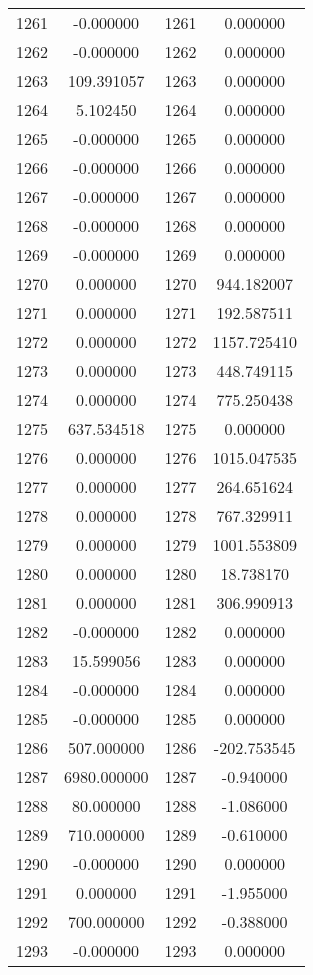 \documentclass[12pt]{article}
\begin{document}
\begin{longtable}{@{}cccc@{}}
1261 & -0.000000 & 1261 & 0.000000 \\
1262 & -0.000000 & 1262 & 0.000000 \\
1263 & 109.391057 & 1263 & 0.000000 \\
1264 & 5.102450 & 1264 & 0.000000 \\
1265 & -0.000000 & 1265 & 0.000000 \\
1266 & -0.000000 & 1266 & 0.000000 \\
1267 & -0.000000 & 1267 & 0.000000 \\
1268 & -0.000000 & 1268 & 0.000000 \\
1269 & -0.000000 & 1269 & 0.000000 \\
1270 & 0.000000 & 1270 & 944.182007 \\
1271 & 0.000000 & 1271 & 192.587511 \\
1272 & 0.000000 & 1272 & 1157.725410 \\
1273 & 0.000000 & 1273 & 448.749115 \\
1274 & 0.000000 & 1274 & 775.250438 \\
1275 & 637.534518 & 1275 & 0.000000 \\
1276 & 0.000000 & 1276 & 1015.047535 \\
1277 & 0.000000 & 1277 & 264.651624 \\
1278 & 0.000000 & 1278 & 767.329911 \\
1279 & 0.000000 & 1279 & 1001.553809 \\
1280 & 0.000000 & 1280 & 18.738170 \\
1281 & 0.000000 & 1281 & 306.990913 \\
1282 & -0.000000 & 1282 & 0.000000 \\
1283 & 15.599056 & 1283 & 0.000000 \\
1284 & -0.000000 & 1284 & 0.000000 \\
1285 & -0.000000 & 1285 & 0.000000 \\
1286 & 507.000000 & 1286 & -202.753545 \\
1287 & 6980.000000 & 1287 & -0.940000 \\
1288 & 80.000000 & 1288 & -1.086000 \\
1289 & 710.000000 & 1289 & -0.610000 \\
1290 & -0.000000 & 1290 & 0.000000 \\
1291 & 0.000000 & 1291 & -1.955000 \\
1292 & 700.000000 & 1292 & -0.388000 \\
1293 & -0.000000 & 1293 & 0.000000 \\

\end{longtable}
\end{document}
